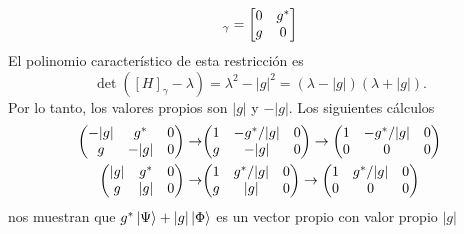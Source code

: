 \documentclass{article}
\begin{document}
\begin{equation}
[H]_\gamma=\mqty[0 & g^*\\ g & 0 ]
\end{equation}
El polinomio característico de esta restricción es
\begin{equation}
\det([H]_\gamma-\lambda)=\lambda^2-|g|^2=(\lambda-|g|)(\lambda+|g|).
\end{equation}
Por lo tanto, los valores propios son $|g|$ y $-|g|$. Los siguientes cálculos
\begin{align}
\begin{split}
\mqty(-|g| & g^* & 0\\g & -|g| & 0)\rightarrow&\mqty(1 & -g^*/|g| & 0\\g & -|g| & 0)\rightarrow\mqty(1 & -g^*/|g| & 0\\0 & 0 & 0)\\
\mqty(|g| & g^* & 0\\g & |g| & 0)\rightarrow&\mqty(1 & g^*/|g| & 0\\g & |g| & 0)\rightarrow\mqty(1 & g^*/|g| & 0\\0 & 0 & 0)\\
\end{split}
\end{align}
nos muestran que $g^*\ket{\Psi}+|g|\ket{\Phi}$ es un vector propio con valor propio $|g|$
\end{document}
